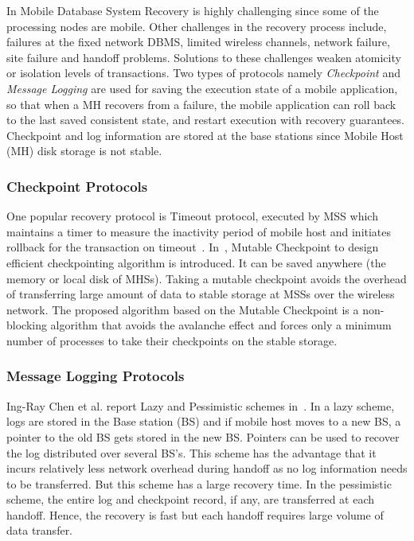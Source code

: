 \documentclass{sig-alternate-05-2015}
\begin{document}
In Mobile Database System Recovery is highly challenging since some of
the processing nodes are mobile. Other challenges in the recovery
process include, failures at the fixed network DBMS, limited wireless
channels, network failure, site failure and handoff
problems. Solutions to these challenges weaken atomicity or isolation
levels of transactions. Two types of protocols namely
\emph{Checkpoint} and \emph{Message Logging} are used for saving the
execution state of a mobile application, so that when a MH recovers
from a failure, the mobile application can roll back to the last saved
consistent state, and restart execution with recovery
guarantees. Checkpoint and log information are stored at the base
stations \cite{gadiraju2004recovery} since Mobile Host (MH) disk
storage is not stable.

\subsubsection{Checkpoint Protocols}

One popular recovery protocol is Timeout protocol, executed by MSS
which maintains a timer to measure the inactivity period of mobile
host and initiates rollback for the transaction on
timeout~\cite{gore2000recovery}. In~\cite{cao2001mutable}, Mutable
Checkpoint to design efficient checkpointing algorithm is
introduced. It can be saved anywhere (the memory or local disk of
MHSs). Taking a mutable checkpoint avoids the overhead of transferring
large amount of data to stable storage at MSSs over the wireless
network. The proposed algorithm based on the Mutable Checkpoint is a
non- blocking algorithm that avoids the avalanche effect and forces
only a minimum number of processes to take their checkpoints on the
stable storage.

\subsubsection{Message Logging Protocols}

Ing-Ray Chen et al. report Lazy and Pessimistic schemes
in~\cite{chen2005failure}. In a lazy scheme, logs are stored in the
Base station (BS) and if mobile host moves to a new BS, a pointer to
the old BS gets stored in the new BS. Pointers can be used to recover
the log distributed over several BS’s. This scheme has the advantage
that it incurs relatively less network overhead during handoff as no
log information needs to be transferred. But this scheme has a large
recovery time. In the pessimistic scheme, the entire log and
checkpoint record, if any, are transferred at each handoff. Hence, the
recovery is fast but each handoff requires large volume of data
transfer.
\end{document}
